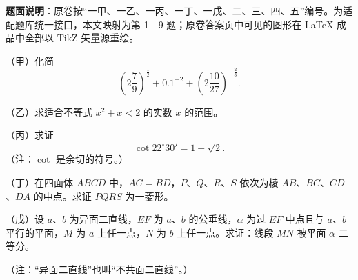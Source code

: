 

\begin{gktip}
\textbf{题面说明}：原卷按“一甲、一乙、一丙、一丁、一戊、二、三、四、五”编号。为适配题库统一接口，本文映射为第 1—9 题；原卷答案页中可见的图形在 LaTeX 成品中全部以 TikZ 矢量源重绘。
\end{gktip}


\begin{question}
（甲）化简
\[
\left(2\frac79\right)^{\frac12}+0.1^{-2}+\left(2\frac{10}{27}\right)^{-\frac23}.
\]

\end{question}
\begin{question}
（乙）求适合不等式 $x^2+x<2$ 的实数 $x$ 的范围。

\end{question}
\begin{question}
（丙）求证
\[
\cot22^\circ30'=1+\sqrt2.
\]
（注：$\cot$ 是余切的符号。）

\end{question}
\begin{question}
（丁）在四面体 $ABCD$ 中，$AC=BD$，$P$、$Q$、$R$、$S$ 依次为棱 $AB$、$BC$、$CD$、$DA$ 的中点。求证 $PQRS$ 为一菱形。

\end{question}
\begin{question}
（戊）设 $a$、$b$ 为异面二直线，$EF$ 为 $a$、$b$ 的公垂线，$\alpha$ 为过 $EF$ 中点且与 $a$、$b$ 平行的平面，$M$ 为 $a$ 上任一点，$N$ 为 $b$ 上任一点。求证：线段 $MN$ 被平面 $\alpha$ 二等分。

（注：“异面二直线”也叫“不共面二直线”。）

\end{question}

